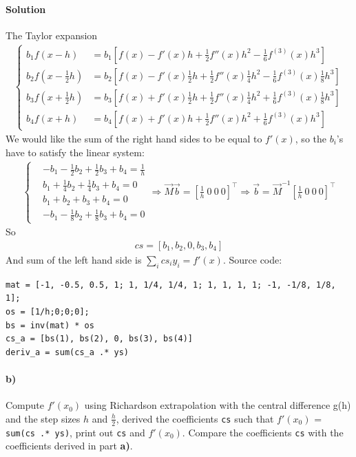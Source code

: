 \documentclass[12pt,a4paper,hidelinks,fleqn]{article}            %
\begin{document}
\paragraph{Solution}
The Taylor expansion
\begin{align*}
\begin{cases}
b_1 f(x - h) & = b_1 [f(x) - f'(x)h + \frac12 f''(x)h^2 - \frac16 f^{(3)}(x)h^3] \\
b_2 f(x - \frac12 h) & = b_2 [f(x) - f'(x) \frac12 h + \frac12 f''(x) \frac14 h^2 - \frac16 f^{(3)}(x)\frac18 h^3] \\
b_3 f(x + \frac12 h) & = b_3 [f(x) + f'(x) \frac12 h + \frac12 f''(x) \frac14 h^2 + \frac16 f^{(3)}(x) \frac18 h^3] \\
b_4 f(x + h) & = b_4 [f(x) + f'(x)h + \frac12 f''(x)h^2 + \frac16 f^{(3)}(x)h^3]
\end{cases}
\end{align*}
We would like the sum of the right hand sides to be equal to $f'(x)$, 
so the $b_i$'s have to satisfy the linear system:
\begin{align*}
\begin{cases}
& -b_1 - \frac12 b_2   + \frac12 b_3 + b_4 = \frac1h \\
& b_1  + \frac14 b_2  + \frac14 b_3 + b_4 = 0   \\
& b_1  + b_2      + b_3     + b_4 = 0   \\
& -b_1 - \frac18 b_2  + \frac18 b_3 + b_4 = 0   
\end{cases} 
\Rightarrow  \vec{M} \vec{b} = \left[\frac1h\ 0\ 0\ 0 \right]^{\top}
\Rightarrow  \vec{b} = \vec{M}^{-1}\left[\frac1h\ 0\ 0\ 0 \right]^{\top}
\end{align*}
So 
\begin{align*}
cs = [b_1, b_2, 0, b_3, b_4]
\end{align*}
And sum of the left hand side is $\sum_i cs_i y_i = f'(x)$. Source code:
\begin{small}
\begin{verbatim}
mat = [-1, -0.5, 0.5, 1; 1, 1/4, 1/4, 1; 1, 1, 1, 1; -1, -1/8, 1/8, 1];
os = [1/h;0;0;0];
bs = inv(mat) * os
cs_a = [bs(1), bs(2), 0, bs(3), bs(4)]
deriv_a = sum(cs_a .* ys)
\end{verbatim}
\end{small}

\paragraph{b)} Compute $f'(x_0)$ using Richardson extrapolation with the central difference g(h) and the step sizes $h$ and $\displaystyle \frac{h}{2}$,
derived the coefficients \verb=cs= such that $f'(x_0)$ = \verb=sum(cs .* ys)=,
print out \verb=cs= and $f'(x_0)$. Compare the coefficients \verb=cs= with the coefficients derived in part \textbf{a)}.
\vspace{-6mm}
\end{document}
